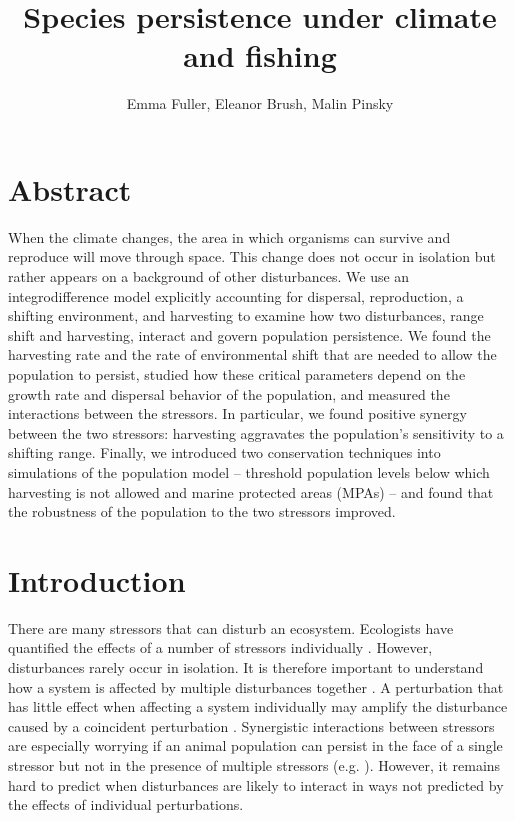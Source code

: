 \documentclass[]{article}
\title{Species persistence under climate and fishing}
\author{Emma Fuller, Eleanor Brush, Malin Pinsky}
\date{}
\begin{document}
\maketitle

\section{Abstract}

When the climate changes, the area in which organisms can survive and reproduce will move through space. 
This change does not occur in isolation but rather appears on a background of other disturbances. We use an 
integrodifference model explicitly accounting for dispersal, reproduction, a shifting environment, and 
harvesting to examine how two disturbances, range shift and harvesting, interact and govern population 
persistence. We found the harvesting rate and the rate of environmental shift that are needed to allow the 
population to persist, studied how these critical parameters depend on the growth rate and dispersal behavior 
of the population, and measured the interactions between the stressors. In particular, we found positive 
synergy between the two stressors: harvesting aggravates the population's sensitivity to a shifting range. 
Finally, we introduced two conservation techniques into simulations of the population model -- threshold 
population levels below which harvesting is not allowed and marine protected areas (MPAs) -- and found that 
the robustness of the population to the two stressors improved.

\section{Introduction}

There are many stressors that can disturb an ecosystem. Ecologists have quantified the effects of a number of stressors individually \citep{Wilcoveetal1998, Crainetal2008, DarlingCote2008}. However, disturbances rarely occur in isolation.  It is therefore important to understand how a system is affected by multiple disturbances together \citep{DoakMorris2010, Fordhametal2013, Foltetal1999}. A perturbation that has little effect when affecting a system individually may amplify the disturbance caused by a coincident perturbation \citep{Crainetal2008, DarlingCote2008}. Synergistic interactions between stressors are especially worrying if an animal population can persist in the face of a single stressor but not in the presence of multiple stressors (e.g.  \citet{Pelletieretal2006}). However, it remains hard to predict when disturbances are likely to interact in ways not predicted by the effects of individual perturbations.
\end{document}
